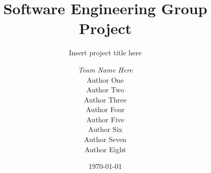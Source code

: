 \documentclass[a4paper, 12pt]{report}
\title{Software Engineering Group Project}
\subtitle{Insert project title here}%
\author{\textit{Team Name Here}\\   %
Author One\\                        %
Author Two\\                        %
Author Three\\                      %
Author Four\\                       %
Author Five\\                       %
Author Six\\                        %
Author Seven\\                      %
Author Eight\\                      %
}
\date{\today}
\begin{document}
    \maketitle
    \romantableofcontents

    
    
    
    
    
    

    \appendix
\end{document}
